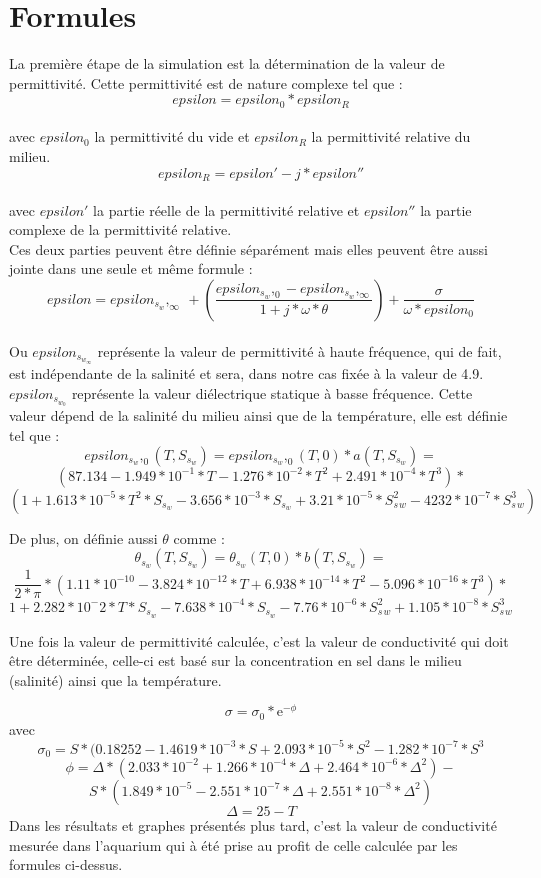 \documentclass{article}
\begin{document}
\section{Formules}
La première étape de la simulation est la détermination de la valeur de permittivité. Cette permittivité est de nature complexe tel que :\\
\[epsilon = epsilon_0*epsilon_R\]\\
avec \(epsilon_0\) la permittivité du vide et \(epsilon_R\) la permittivité relative du milieu.\\
\[epsilon_R = epsilon' - j*epsilon''\]\\
avec \(epsilon'\) la partie réelle de la permittivité relative et \(epsilon''\) la partie complexe de la permittivité relative.\\
Ces deux parties peuvent être définie séparément mais elles peuvent être aussi jointe dans une seule et même formule :\\
\[ epsilon = epsilon_s_w,_\infty\ + (\frac{epsilon_s_w,_0 - epsilon_s_w,_\infty}{1+j*\omega*\theta}) + \frac{\sigma}{\omega * epsilon_0}\]\\
Ou \(epsilon_s_w_\infty\) représente la valeur de permittivité à haute fréquence, qui de fait, est indépendante de la salinité et sera, dans notre cas
fixée à la valeur de 4.9. \(epsilon_s_w_0\) représente la valeur diélectrique statique à basse fréquence. Cette valeur dépend de la salinité du milieu ainsi que de la température, elle est définie tel que :
\[epsilon_s_w,_0(T,S_s_w) = epsilon_s_w,_0(T,0) * a(T,S_s_w) = \] \[(87.134 - 1.949 * 10^{-1}*T - 1.276 * 10^{-2}*T^2 + 2.491 * 10^{-4}*T^3)*\]
\[( 1 + 1.613 * 10^{-5}*T^2 * S_s_w - 3.656 * 10^{-3}*S_s_w + 3.21 * 10^{-5}*S^2_s_w - 4232 * 10^{-7}*S^3_s_w)\]



De plus, on définie aussi \(\theta\) comme :
\[\theta_s_w(T,S_s_w) = \theta_s_w(T,0) * b(T,S_s_w) =\]
\[\frac{1}{2*\pi} * (1.11 * 10^{-10} - 3.824 * 10^{-12} * T + 6.938 * 10^{-14} * T^2 - 5.096 * 10^{-16} * T^3) *\]
\[1 + 2.282 * 10^-2 * T * S_s_w - 7.638 * 10^{-4} * S_s_w - 7.76 * 10^{-6} * S^2_s_w + 1.105 * 10^{-8} * S^3_s_w\]

Une fois la valeur de permittivité calculée, c'est la valeur de conductivité qui doit être déterminée, celle-ci est basé sur la concentration en sel dans le milieu (salinité) ainsi que la température.

\[\sigma = \sigma_0 * \mathrm{e}^{-\phi}\]
avec
\[\sigma_0 = S * ( 0.18252 - 1.4619 * 10^{-3} * S + 2.093 * 10^{-5}*S^2 -  1.282 * 10^{-7} * S^3\]
\[\phi = \Delta * (2.033 * 10^{-2} + 1.266 * 10^{-4} * \Delta + 2.464 * 10^{-6} * \Delta^2) -\] \[S * (1.849 * 10^{-5} - 2.551 * 10^{-7} * \Delta + 2.551 * 10^{-8} * \Delta^2)\]
\[\Delta = 25 - T\]
Dans les résultats et graphes présentés plus tard, c'est la valeur de conductivité mesurée dans l'aquarium qui à été prise au profit de celle calculée par les formules ci-dessus.\\
\end{document}
